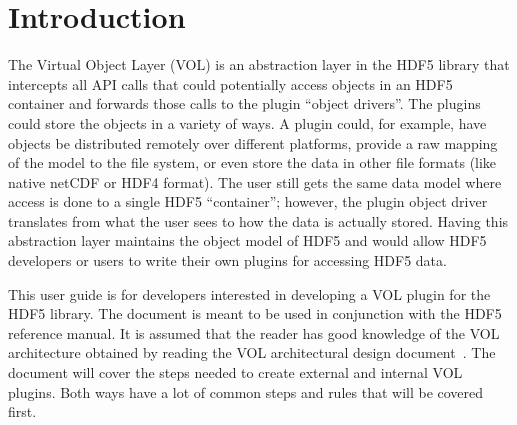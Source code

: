 

\section{Introduction}
The Virtual Object Layer (VOL) is an abstraction layer in the HDF5
library that intercepts all API calls that could potentially access
objects in an HDF5 container and forwards those calls to the plugin
``object drivers''. The plugins could store the objects in a variety of
ways. A plugin could, for example, have objects be distributed
remotely over different platforms, provide a raw mapping of the model
to the file system, or even store the data in other file formats (like
native netCDF or HDF4 format). The user still gets the same data model
where access is done to a single HDF5 “container”; however, the plugin
object driver translates from what the user sees to how the data is
actually stored. Having this abstraction layer maintains the object
model of HDF5 and would allow HDF5 developers or users to write their
own plugins for accessing HDF5 data.

This user guide is for developers interested in developing a VOL
plugin for the HDF5 library. The document is meant to be used in
conjunction with the HDF5 reference manual. It is assumed that the
reader has good knowledge of the VOL architecture obtained by reading
the VOL architectural design document~\cite{vol:rfc}. The
document will cover the steps needed to create external and internal
VOL plugins. Both ways have a lot of common steps and rules that will
be covered first.
